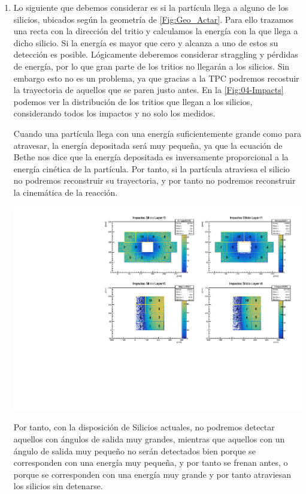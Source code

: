 \begin{enumerate}
    
    \item Lo siguiente que debemos considerar es si la partícula llega a alguno de los silicios, ubicados según la geometría de \cref{Fig:Geo_Actar}. Para ello trazamos una recta con la dirección del tritio y calculamos la energía con la que llega a dicho silicio. Si la energía es mayor que cero y alcanza a uno de estos su detección es posible. Lógicamente deberemos considerar straggling y pérdidas de energía, por lo que gran parte de los tritios no llegarán a los silicios. Sin embargo esto no es un problema, ya que gracias a la TPC podremos recostuir la trayectoria de aquellos que se paren justo antes. En la \cref{Fig:04-Impacts} podemos ver la distribución de los tritios que llegan a los silicios, considerando todos los impactos y no solo los medidos. 
    
    Cuando una partícula llega con una energía suficientemente grande como para atravesar, la energía depositada será muy pequeña, ya que la ecuación de Bethe nos dice que la energía depositada es inversamente proporcional a la energía cinética de la partícula. Por tanto, si la partícula atraviesa el silicio no podremos reconstruir su trayectoria, y por tanto no podremos reconstruir la cinemática de la reacción. 

    \begin{center}
        \includegraphics[width=0.8\linewidth]{Imagenes/Impacts_Ex0.00_incIdx0.pdf}

        \label{Fig:04-Impacts}
    \end{center}
    

    Por tanto, con la disposición de Silicios actuales, no podremos detectar aquellos con ángulos de salida muy grandes, mientras que aquellos con un ángulo de salida muy pequeño no serán detectados bien porque se corresponden con una energía muy pequeña, y por tanto se frenan antes, o porque se corresponden con una energía muy grande y por tanto atraviesan los silicios sin detenarse. 


\end{enumerate}
